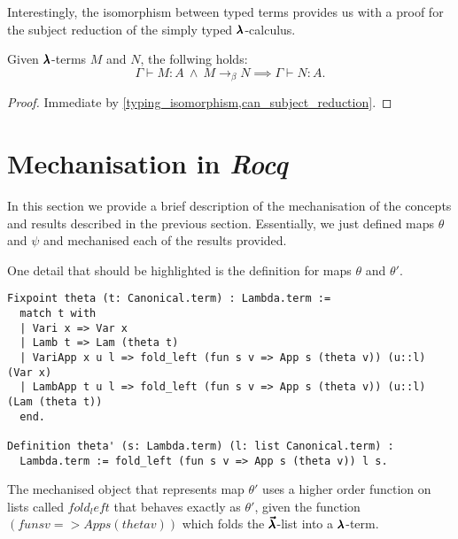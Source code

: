 Interestingly, the isomorphism between typed terms provides us with a proof for the subject reduction of the simply typed $\pmb{\lambda}$-calculus.

\begin{corollary}
  Given $\pmb{\lambda}$-terms $M$ and $N$, the follwing holds:
  \[
    \Gamma \vdash M:A \ \land \ M \to_{\beta} N \implies \Gamma \vdash N:A.
  \]
\end{corollary}
\begin{proof}
  Immediate by \cref{typing_isomorphism,can_subject_reduction}.
\end{proof}
  

\section{Mechanisation in \textit{Rocq}}

In this section we provide a brief description of the mechanisation of the concepts and results described in the previous section.
Essentially, we just defined maps $\theta$ and $\psi$ and mechanised each of the results provided.

One detail that should be highlighted is the definition for maps $\theta$ and $\theta'$.
\begin{lstlisting}[language=Coq]
Fixpoint theta (t: Canonical.term) : Lambda.term :=
  match t with
  | Vari x => Var x
  | Lamb t => Lam (theta t)
  | VariApp x u l => fold_left (fun s v => App s (theta v)) (u::l) (Var x)
  | LambApp t u l => fold_left (fun s v => App s (theta v)) (u::l) (Lam (theta t))
  end.

Definition theta' (s: Lambda.term) (l: list Canonical.term) :
  Lambda.term := fold_left (fun s v => App s (theta v)) l s.
\end{lstlisting}

The mechanised object that represents map $\theta'$ uses a higher order function on lists called \lst$fold_left$ that behaves exactly as $\theta'$, given the function \lst$(fun s v => App s (theta v))$ which folds the $\pmb{\vec \lambda}$-list into a $\pmb{\lambda}$-term.

